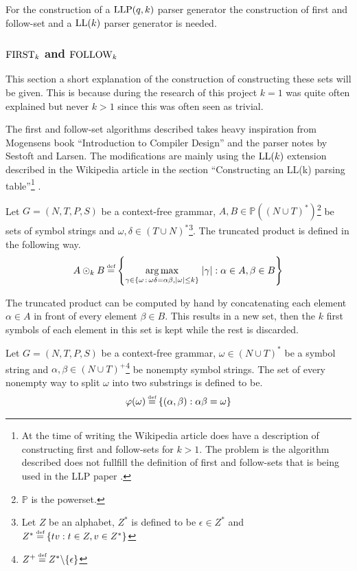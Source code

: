 For the construction of a $\text{LLP}(q,k)$ parser generator the construction of first and follow-set \cite[5]{Vagner2007} and a $\text{LL}(k)$ parser generator is needed.

\subsubsection{\texorpdfstring{$\text{FIRST}_k$}{TEXT} and \texorpdfstring{$\text{FOLLOW}_k$}{TEXT}}
This section a short explanation of the construction of constructing these sets will be given. This is because during the research of this project $k = 1$ was quite often explained but never $k > 1$ since this was often seen as trivial.

The first and follow-set algorithms described takes heavy inspiration from Mogensens book ``Introduction to Compiler Design'' \cite[55-65]{Mogensen} and the parser notes \cite[10-15]{notes:parser} by Sestoft and Larsen. The modifications are mainly using the $\text{LL}(k)$ extension described in the Wikipedia article in the section ``Constructing an LL(k) parsing table''\footnote{At the time of writing the Wikipedia article does have a description of constructing first and follow-sets for $k > 1$. The problem is the algorithm described does not fullfill the definition of first and follow-sets that is being used in the LLP paper \cite[5]{Vagner2007}.} \cite{wiki:LL_parser}.

\begin{definition}
    Let $G = (N, T, P, S)$ be a context-free grammar, $A, B \in \mathbb{P}((N \cup T)^*)$\footnote{$\mathbb{P}$ is the powerset.} be sets of symbol strings and $\omega, \delta \in (T \cup N)^*$\footnote{Let $Z$ be an alphabet, $Z^*$ is defined to be $\epsilon \in Z^*$ and $Z^* \defeq \{tv : t \in Z, v \in Z^*\}$}. The truncated product is defined in the following way.
    \begin{gather*}
        A \odot_k B \defeq \left\{\underset{\gamma \in \{\omega \, : \, \omega\delta = \alpha\beta, |\omega| \leq k\}}{\arg \max} \; |\gamma| : \alpha \in A, \beta \in B\right\}
    \end{gather*}
\end{definition}
\noindent The truncated product can be computed by hand by concatenating each element $\alpha \in A$ in front of every element $\beta \in B$. This results in a new set, then the $k$ first symbols of each element in this set is kept while the rest is discarded. 

\begin{definition}
    Let $G = (N, T, P, S)$ be a context-free grammar, $\omega \in (N \cup T)^*$ be a symbol string and $\alpha, \beta \in (N \cup T)^+$\footnote{$Z^+ \defeq Z^*\backslash \{\epsilon\}$} be nonempty symbol strings. The set of every nonempty way to split $\omega$ into two substrings is defined to be.
    \begin{gather*}
        \varphi(\omega) \defeq \{(\alpha, \beta) : \alpha\beta = \omega\}
    \end{gather*}
\end{definition}

